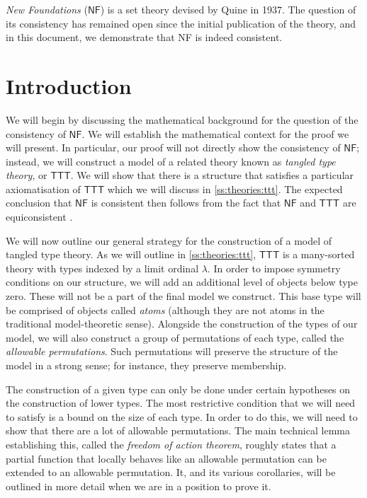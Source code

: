 \newcommand{\NF}{\ensuremath{\mathsf{NF}}}
\newcommand{\TST}{\ensuremath{\mathsf{TST}}}
\newcommand{\TTT}{\ensuremath{\mathsf{TTT}}}

\newcommand{\Con}{\operatorname{Con}}
\newcommand{\ttype}{\operatorname{type}}
\newcommand{\mquote}[1]{\ensuremath{\text{‘}#1\text{’}}}

\emph{New Foundations} (\NF) is a set theory devised by Quine in 1937. \cite{quine-nf}
The question of its consistency has remained open since the initial publication of the theory, and in this document, we demonstrate that NF is indeed consistent.

\section{Introduction}
\label{s:overview}

We will begin by discussing the mathematical background for the question of the consistency of \NF.
We will establish the mathematical context for the proof we will present.
In particular, our proof will not directly show the consistency of \NF; instead, we will construct a model of a related theory known as \emph{tangled type theory}, or \TTT.
We will show that there is a structure that satisfies a particular axiomatisation of {\TTT} which we will discuss in \cref{ss:theories:ttt}.
The expected conclusion that {\NF} is consistent then follows from the fact that {\NF} and {\TTT} are equiconsistent \cite{holmes-ttt}.

We will now outline our general strategy for the construction of a model of tangled type theory.
As we will outline in \cref{ss:theories:ttt}, {\TTT} is a many-sorted theory with types indexed by a limit ordinal \( \lambda \).
In order to impose symmetry conditions on our structure, we will add an additional level of objects below type zero.
These will not be a part of the final model we construct.
This base type will be comprised of objects called \emph{atoms} (although they are not atoms in the traditional model-theoretic sense).
Alongside the construction of the types of our model, we will also construct a group of permutations of each type, called the \emph{allowable permutations}.
Such permutations will preserve the structure of the model in a strong sense; for instance, they preserve membership.

The construction of a given type can only be done under certain hypotheses on the construction of lower types.
The most restrictive condition that we will need to satisfy is a bound on the size of each type.
In order to do this, we will need to show that there are a lot of allowable permutations.
The main technical lemma establishing this, called the \emph{freedom of action theorem}, roughly states that a partial function that locally behaves like an allowable permutation can be extended to an allowable permutation.
It, and its various corollaries, will be outlined in more detail when we are in a position to prove it.

